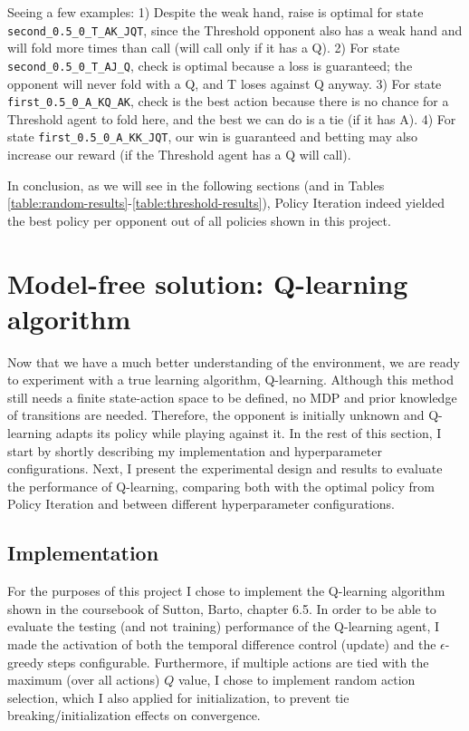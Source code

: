 Seeing a few examples: 1) Despite the weak hand, raise is optimal for state \Verb|second_0.5_0_T_AK_JQT|, since the Threshold opponent also has a weak hand and will fold more times than call (will call only if it has a Q). 2) For state \Verb|second_0.5_0_T_AJ_Q|, check is optimal because a loss is guaranteed; the opponent will never fold with a Q, and T loses against Q anyway. 3) For state \Verb|first_0.5_0_A_KQ_AK|, check is the best action because there is no chance for a Threshold agent to fold here, and the best we can do is a tie (if it has A). 4) For state \Verb|first_0.5_0_A_KK_JQT|, our win is guaranteed and betting may also increase our reward (if the Threshold agent has a Q will call).

In conclusion, as we will see in the following sections (and in Tables \ref{table:random-results}-\ref{table:threshold-results}), Policy Iteration indeed yielded the best policy per opponent out of all policies shown in this project.

\section{Model-free solution: Q-learning algorithm}

Now that we have a much better understanding of the environment, we are ready to experiment with a true learning algorithm, Q-learning. Although this method still needs a finite state-action space to be defined, no MDP and prior knowledge of transitions are needed. Therefore, the opponent is initially unknown and Q-learning adapts its policy while playing against it. In the rest of this section, I start by shortly describing my implementation and hyperparameter configurations. Next, I present the experimental design and results to evaluate the performance of Q-learning, comparing both with the optimal policy from Policy Iteration and between different hyperparameter configurations.

\subsection{Implementation}

For the purposes of this project I chose to implement the Q-learning algorithm shown in the coursebook of Sutton, Barto, chapter 6.5. In order to be able to evaluate the testing (and not training) performance of the Q-learning agent, I made the activation of both the temporal difference control (update) and the $\epsilon$-greedy steps configurable. Furthermore, if multiple actions are tied with the maximum (over all actions) $Q$ value, I chose to implement random action selection, which I also applied for initialization, to prevent tie breaking/initialization effects on convergence.

